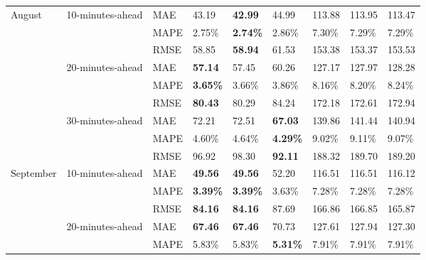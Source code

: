 {\begin{longtable}{lllllllll}
 
{August}    & {10-minutes-ahead}    & MAE                       & 43.19          & \textbf{42.99} & 44.99 & 113.88 & 113.95 & 113.47 \\
 &                                   & MAPE & 2.75\%           & \textbf{2.74\%}    & 2.86\%            & 7.30\%    & 7.29\%      & 7.29\%     \\
 &                                   & RMSE & 58.85            & \textbf{58.94}     & 61.53             & 153.38    & 153.37      & 153.53     \\ \cline{2-9}
 & {20-minutes-ahead} & MAE  & \textbf{57.14}   & 57.45              & 60.26             & 127.17    & 127.97      & 128.28     \\
 &                                   & MAPE & \textbf{3.65\%}  & 3.66\%             & 3.86\%            & 8.16\%    & 8.20\%      & 8.24\%     \\
 &                                   & RMSE & \textbf{80.43}   & 80.29              & 84.24             & 172.18    & 172.61      & 172.94     \\ \cline{2-9}
 & {30-minutes-ahead} & MAE  & 72.21            & 72.51              & \textbf{67.03}    & 139.86    & 141.44      & 140.94     \\
 &                                   & MAPE & 4.60\%           & 4.64\%             & \textbf{4.29\%}   & 9.02\%    & 9.11\%      & 9.07\%     \\
 &                                   & RMSE & 96.92            & 98.30              & \textbf{92.11}    & 188.32    & 189.70      & 189.20     \\ \hline
{September} & {10-minutes-ahead}    & MAE                       & \textbf{49.56} & \textbf{49.56} & 52.20 & 116.51 & 116.51 & 116.12 \\
 &                                   & MAPE & \textbf{3.39\%}  & \textbf{3.39\%}    & 3.63\%            & 7.28\%    & 7.28\%      & 7.28\%     \\
 &                                   & RMSE & \textbf{84.16}   & \textbf{84.16}     & 87.69             & 166.86    & 166.85      & 165.87     \\ \cline{2-9}
                           & {20-minutes-ahead}    & MAE                       & \textbf{67.46} & \textbf{67.46} & 70.73 & 127.61 & 127.94 & 127.30 \\
 &                                   & MAPE & 5.83\%           & 5.83\%             & \textbf{5.31\%}   & 7.91\%    & 7.91\%      & 7.91\%     \\

\end{longtable}}
